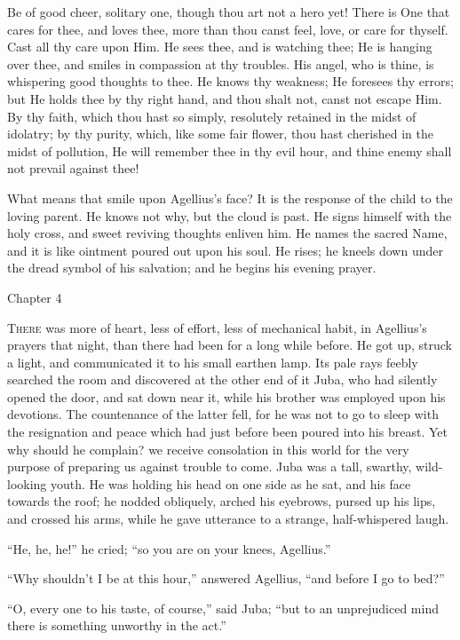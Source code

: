 Be of good cheer, solitary one, though thou art not a hero yet!
There is One that cares for thee, and loves thee, more than thou canst
feel, love, or care for thyself. Cast all thy care upon Him. He sees
thee, and is watching thee; He is hanging over thee, and smiles in
compassion at thy troubles. His angel, who is thine, is whispering
good thoughts to thee. He knows thy weakness; He foresees thy errors;
but He holds thee by thy right hand, and thou shalt not, canst not
escape Him. By thy faith, which thou hast so simply, resolutely
retained in the midst of idolatry; by thy purity, which, like some
fair flower, thou hast cherished in the midst of pollution, He will
remember thee in thy evil hour, and thine enemy shall not prevail
against thee!

What means that smile upon Agellius's face? It is the response of
the child to the loving parent. He knows not why, but the cloud is
past. He signs himself with the holy cross, and sweet reviving
thoughts enliven him. He names the sacred Name, and it is like
ointment poured out upon his soul. He rises; he kneels down under the
dread symbol of his salvation; and he begins his evening prayer.

Chapter 4


T\textsc{here} was more of heart, less of effort, less of mechanical
habit, in Agellius's prayers that night, than there had been for a
long while before. He got up, struck a light, and communicated it to
his small earthen lamp. Its pale rays feebly searched the room and
discovered at the other end of it Juba, who had silently opened the
door, and sat down near it, while his brother was employed upon his
devotions. The countenance of the latter fell, for he was not to go to
sleep with the resignation and peace which had just before been poured
into his breast. Yet why should he complain? we receive consolation in
this world for the very purpose of preparing us against trouble to
come. Juba was a tall, swarthy, wild-looking youth. He was holding his
head on one side as he sat, and his face towards the roof; he nodded
obliquely, arched his eyebrows, pursed up his lips, and crossed his
arms, while he gave utterance to a strange, half-whispered laugh.

``He, he, he!'' he cried; ``so you are on your knees,
Agellius.''

``Why shouldn't I be at this hour,'' answered Agellius,
``and before I go to bed?''

``O, every one to his taste, of course,'' said Juba;
``but to an unprejudiced mind there is something unworthy in the
act.''

